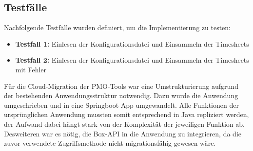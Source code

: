 \subsection{Testfälle}
Nachfolgende Testfälle wurden definiert, um die Implementierung zu testen:
\begin{itemize}
\item \textbf{Testfall 1:} Einlesen der Konfigurationsdatei und Einsammeln der Timesheets
\item \textbf{Testfall 2:} Einlesen der Konfigurationsdatei und Einsammeln der Timesheets mit Fehler
\end{itemize}

Für die Cloud-Migration der PMO-Tools war eine Umstrukturierung aufgrund der bestehenden Anwendungsstruktur notwendig. Dazu wurde die Anwendung umgeschrieben und in eine Springboot App umgewandelt. Alle Funktionen der ursprünglichen Anwendung mussten somit entsprechend in Java repliziert werden, der Aufwand dabei hängt stark von der Komplexität der jeweiligen Funktion ab. Desweiteren war es nötig, die Box-\ac{API} in die Anwendung zu integrieren, da die zuvor verwendete Zugriffsmethode nicht migrationsfähig gewesen wäre.